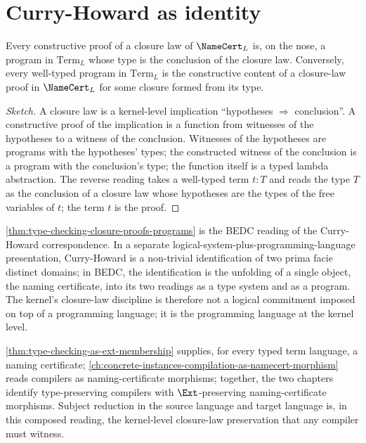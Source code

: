 \section{Curry-Howard as identity}
\label{sec:type-checking-curry-howard}

\begin{theorem}
\label{thm:type-checking-closure-proofs-programs}
Every constructive proof of a closure law of $\NameCert_L$ is, on the nose, a program in $\mathrm{Term}_L$ whose type is the conclusion of the closure law. Conversely, every well-typed program in $\mathrm{Term}_L$ is the constructive content of a closure-law proof in $\NameCert_L$ for some closure formed from its type.
\end{theorem}

\begin{proof}[Sketch]
A closure law is a kernel-level implication ``hypotheses $\Rightarrow$ conclusion''. A constructive proof of the implication is a function from witnesses of the hypotheses to a witness of the conclusion. Witnesses of the hypotheses are programs with the hypotheses' types; the constructed witness of the conclusion is a program with the conclusion's type; the function itself is a typed lambda abstraction. The reverse reading takes a well-typed term $t \colon T$ and reads the type $T$ as the conclusion of a closure law whose hypotheses are the types of the free variables of $t$; the term $t$ is the proof.
\end{proof}

\begin{remark}
\label{rem:type-checking-curry-howard-built-in}
\autoref{thm:type-checking-closure-proofs-programs} is the BEDC reading of the Curry-Howard correspondence. In a separate logical-system-plus-programming-language presentation, Curry-Howard is a non-trivial identification of two prima facie distinct domains; in BEDC, the identification is the unfolding of a single object, the naming certificate, into its two readings as a type system and as a program. The kernel's closure-law discipline is therefore not a logical commitment imposed on top of a programming language; it is the programming language at the kernel level.
\end{remark}

\begin{remark}
\label{rem:type-checking-compilation-composition}
\autoref{thm:type-checking-as-ext-membership} supplies, for every typed term language, a naming certificate; \autoref{ch:concrete-instances-compilation-as-namecert-morphism} reads compilers as naming-certificate morphisms; together, the two chapters identify type-preserving compilers with $\Ext$-preserving naming-certificate morphisms. Subject reduction in the source language and target language is, in this composed reading, the kernel-level closure-law preservation that any compiler must witness.
\end{remark}
